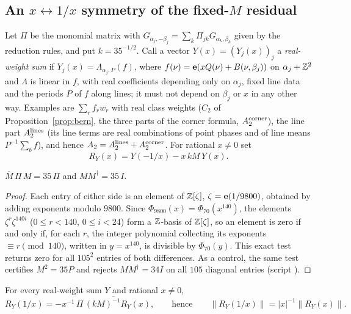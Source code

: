 \subsection{An $x\leftrightarrow1/x$ symmetry of the fixed-$M$ residual}\label{sec:xinv}
Let $\Pi$ be the monomial matrix with $G_{\alpha_j,-\beta_j}=\sum_k\Pi_{jk}G_{\alpha_k,\beta_k}$ given by the reduction rules, and put $k=35^{-1/2}$. Call a vector $Y(x)=(Y_j(x))_j$ a
\emph{real-weight sum} if $Y_j(x)=\Lambda_{\alpha_j,P}(f)$, where $f(\nu)=\mathbf{e}(xQ(\nu)+B(\nu,\beta_j))$ on $\alpha_j+\mathbb{Z}^2$ and $\Lambda$ is linear in $f$, with real coefficients depending only on
$\alpha_j$, fixed line data and the periods $P$ of $f$ along lines; it must not depend on $\beta_j$ or $x$ in any other way. Examples are $\sum_rf_rw_r$ with real class weights ($C_2$ of
Proposition~\ref{prop:bern}, the three parts of the corner formula, $A_2^{\rm corner}$), the line part $A_2^{\rm lines}$ (its line terms are real combinations of point
phases and of line means $P^{-1}\sum_bf$), and hence $A_2=A_2^{\rm lines}+A_2^{\rm corner}$. For rational $x\neq0$ set
\[ R_Y(x)=Y(-1/x)-x\,kM\,Y(x). \]
\begin{proposition}\label{prop:MPi}
$\overline{M}\,\Pi\,M=35\,\Pi$ and $MM^{\dagger}=35\,I$.
\end{proposition}
\begin{proof}
Each entry of either side is an element of $\mathbb{Z}[\zeta]$, $\zeta=\mathbf{e}(1/9800)$, obtained by adding exponents modulo $9800$. Since $\Phi_{9800}(x)=\Phi_{70}(x^{140})$, the elements
$\zeta^r\zeta^{140i}$ ($0\le r<140$, $0\le i<24$) form a $\mathbb{Z}$-basis of $\mathbb{Z}[\zeta]$, so an element is zero if and only if, for each $r$, the integer polynomial collecting its
exponents $\equiv r\pmod{140}$, written in $y=x^{140}$, is divisible by $\Phi_{70}(y)$. This exact test returns zero for all $105^2$ entries of both differences. As a control,
the same test certifies $M^2=35P$ and rejects $MM^\dagger=34I$ on all $105$ diagonal entries (script ).
\end{proof}
\begin{theorem}\label{thm:xinv}
For every real-weight sum $Y$ and rational $x\neq0$,
\[ R_Y(1/x)=-x^{-1}\,\overline{\Pi\,(kM)^{-1}R_Y(x)},\qquad\text{hence}\qquad \|R_Y(1/x)\|=|x|^{-1}\|R_Y(x)\|. \]
\end{theorem}
